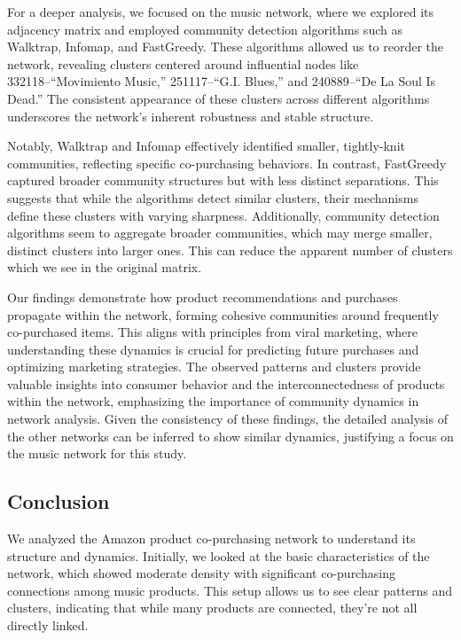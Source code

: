 \documentclass[
]{article}
\begin{document}
For a deeper analysis, we focused on the music network, where we
explored its adjacency matrix and employed community detection
algorithms such as Walktrap, Infomap, and FastGreedy. These algorithms
allowed us to reorder the network, revealing clusters centered around
influential nodes like 332118--``Movimiento Music,'' 251117--``G.I.
Blues,'' and 240889--``De La Soul Is Dead.'' The consistent appearance
of these clusters across different algorithms underscores the network's
inherent robustness and stable structure.

Notably, Walktrap and Infomap effectively identified smaller,
tightly-knit communities, reflecting specific co-purchasing behaviors.
In contrast, FastGreedy captured broader community structures but with
less distinct separations. This suggests that while the algorithms
detect similar clusters, their mechanisms define these clusters with
varying sharpness. Additionally, community detection algorithms seem to
aggregate broader communities, which may merge smaller, distinct
clusters into larger ones. This can reduce the apparent number of
clusters which we see in the original matrix.

Our findings demonstrate how product recommendations and purchases
propagate within the network, forming cohesive communities around
frequently co-purchased items. This aligns with principles from viral
marketing, where understanding these dynamics is crucial for predicting
future purchases and optimizing marketing strategies. The observed
patterns and clusters provide valuable insights into consumer behavior
and the interconnectedness of products within the network, emphasizing
the importance of community dynamics in network analysis. Given the
consistency of these findings, the detailed analysis of the other
networks can be inferred to show similar dynamics, justifying a focus on
the music network for this study.

\subsection{Conclusion}\label{conclusion}

We analyzed the Amazon product co-purchasing network to understand its
structure and dynamics. Initially, we looked at the basic
characteristics of the network, which showed moderate density with
significant co-purchasing connections among music products. This setup
allows us to see clear patterns and clusters, indicating that while many
products are connected, they're not all directly linked.
\end{document}
